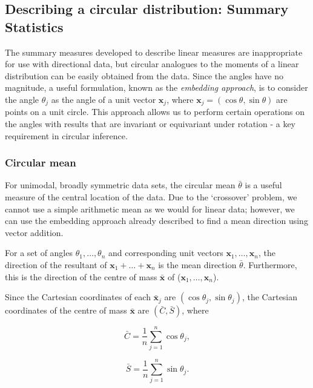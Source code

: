 \documentclass[../../ArchStats.tex]{subfiles}
\begin{document}
\subsection{Describing a circular distribution: Summary Statistics}

The summary measures developed to describe linear measures are inappropriate for use with directional data, but circular analogues to the moments of a linear distribution can be easily obtained from the data. Since the angles have no magnitude, a useful formulation, known as the \textit{embedding approach}, is to consider the angle $\theta_j$ as the angle of a unit vector $\mathbf{x}_j$, where $\mathbf{x}_j = (\cos\theta, \sin\theta)$ are points on a unit circle. This approach allows us to perform certain operations on the angles with results that are invariant or equivariant under rotation - a key requirement in circular inference.

\subsubsection{Circular mean}

For unimodal, broadly symmetric data sets, the circular mean $\bar{\theta}$ is a useful measure of the central location of the data. Due to the `crossover' problem, we cannot use a simple arithmetic mean as we would for linear data; however, we can use the embedding approach already described to find a mean direction using vector addition. 

For a set of angles $\theta_1, \dots, \theta_n$ and corresponding unit vectors $\mathbf{x}_1, \dots, \mathbf{x}_n$, the direction of the resultant of $\mathbf{x}_1 + \dots + \mathbf{x}_n$ is the mean direction $\bar{\theta}$. Furthermore, this is the direction of the centre of mass $\mathbf{\bar{x}}$ of ($\mathbf{x}_1, \dots, \mathbf{x}_n$).

Since the Cartesian coordinates of each $\mathbf{\bar{x}}_j$ are $(\cos\theta_j, \sin\theta_j)$, the Cartesian coordinates of the centre of mass $\mathbf{\bar{x}}$ are $(\bar{C}, \bar{S})$, where

	\begin{minipage}{0.5\linewidth}
	\[\bar{C} = \frac{1}{n} \sum_{j=1}^{n} \cos \theta_j,\]
	\end{minipage}
	\hspace{0.5cm}
	\begin{minipage}{0.5\linewidth}
	\[\bar{S} = \frac{1}{n} \sum_{j=1}^{n} \sin \theta_j.\]
	\end{minipage}
	
\end{document}
